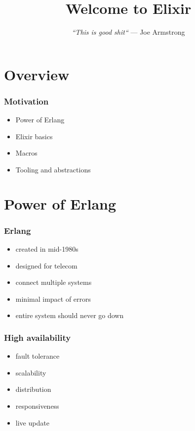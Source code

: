 \documentclass{beamer}
\begin{document}
\title{Welcome to Elixir}
\subtitle{
  \textit{
    \linebreak
    ``This is good shit``
    \linebreak
  }
  \tiny{\textrm{--- Joe Armstrong}}
}
\frame{\titlepage}


\section[Section]{Overview}

\begin{frame}
  \frametitle{Motivation}
  \begin{itemize}
  \item Power of Erlang
  \item Elixir basics
  \item Macros
  \item Tooling and abstractions
  \end{itemize}
\end{frame}

\section[Section]{Power of Erlang}

\begin{frame}
  \frametitle{Erlang}
  \begin{itemize}
  \item created in mid-1980s
  \item designed for telecom
  \item connect multiple systems
  \item minimal impact of errors
  \item entire system should never go down
  \end{itemize}
\end{frame}

\begin{frame}
  \frametitle{High availability}
  \begin{itemize}
  \item fault tolerance
  \item scalability
  \item distribution
  \item responsiveness
  \item live update
  \end{itemize}
\end{frame}
\end{document}
